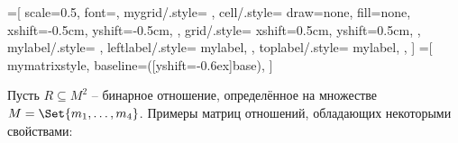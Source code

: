 \documentclass[a4paper,10pt]{article}
\begin{document}
\newenvironment{mygridscope}[1]{%
    \let\oldn\n
    \def\n{#1}

    \newcommand\drawcell[2][]{%
        \draw[cell, ##1] (##2) rectangle +(1,1); }
    \newcommand\drawcells[1]{%
        \foreach \i in {1,...,\n} {
            \foreach \j in {1,...,\n} {
                ##1
            }
        }
    }
    \newcommand\drawgrid[1][]{%
        \draw[grid, ##1] (0,0) grid (\n,\n); }
    \newcommand\drawleftlabels[2][]{%
        \foreach \i in {1,...,\n} {
            \node[leftlabel,##1] at (\i,0) {##2};
        }
    }
    \newcommand\drawtoplabels[2][]{%
        \foreach \i in {1,...,\n} {
            \node[toplabel,##1] at (0,\i) {##2};
        }
    }

    \begin{scope}[yshift=\n cm, rotate=-90]
    \begin{scope}[xshift=-0.5cm, yshift=-0.5cm]
    \begin{scope}[mygrid]
}{
    \end{scope}
    \end{scope}
    \end{scope}
    \let\n\oldn
}

\newcommand\drawlabelnorth[1]{%
    \node[above,align=center] at (current bounding box.north) {#1};
}
\newcommand\drawlabelsouth[1]{%
    \node[below,align=center] at (current bounding box.south) {#1};
}

=[
    scale=0.5,
    font=\small,
    mygrid/.style={
    },
    cell/.style={ %
        draw=none,
        fill=none,
        xshift=-0.5cm,
        yshift=-0.5cm,
    },
    grid/.style={ %
        xshift=0.5cm,
        yshift=0.5cm,
    },
    mylabel/.style={
    },
    leftlabel/.style={
        mylabel,
    },
    toplabel/.style={
        mylabel,
    },
]
=[
    mymatrixstyle,
    baseline={([yshift=-0.6ex]base)},
]

\def\matrixsize{4}

Пусть $R \subseteq M^2$ -- бинарное отношение, определённое на множестве $M = \Set{m_1, \dotsc, m_{\matrixsize}}$.
Примеры матриц отношений, обладающих некоторыми свойствами:
\end{document}
